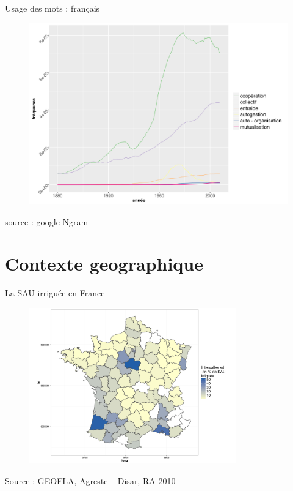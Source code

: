 \documentclass[newPxFont]{beamer}
\begin{document}

\begin{frame}[c]{Usage des mots : français}
\vspace{-2em}
\begin{figure}
	\centering
	\includegraphics[width = 1\textwidth]{img/ngram_auto}
\end{figure}
\small{source : google Ngram}

\end{frame}


\section{Contexte geographique}

\begin{frame}[c]{La SAU irriguée en France}
\vspace{-2em}
\begin{figure}
	\centering
	\includegraphics[width = 0.8\textwidth]{img/SAU}
\end{figure}
\small{Source : GEOFLA, Agreste -- Disar, RA 2010}

\end{frame}
\end{document}
